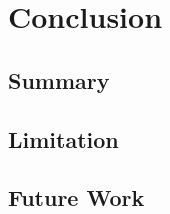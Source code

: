\chapter{Conclusion}
\label{cha:conc}

\section{Summary}
\label{sec:summary}

\section{Limitation}
\label{sec:limitation}

\section{Future Work}
\label{sec:future}





